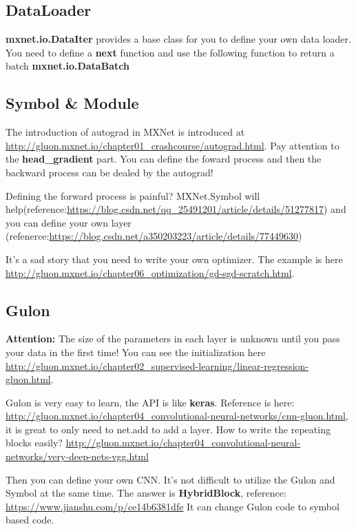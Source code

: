 \documentclass[english]{../TeXTemplate/pkupaper}
\begin{document}
\subsection{DataLoader}

\textbf{mxnet.io.DataIter} provides a base class for you to define your own data loader. You need to define a \textbf{next} function and use the following function to return a batch \textbf{mxnet.io.DataBatch}



\subsection{Symbol \& Module}


The introduction of autograd in MXNet is introduced at \url{http://gluon.mxnet.io/chapter01_crashcourse/autograd.html}. Pay attention to the \textbf{head\_gradient} part. You can define the foward process and then the backward process can be dealed by the autograd!

Defining the forward process is painful? MXNet.Symbol will help(reference:\url{https://blog.csdn.net/qq_25491201/article/details/51277817}) and you can define your own layer (refenerce:\url{https://blog.csdn.net/a350203223/article/details/77449630})

It's a sad story that you need to write your own optimizer. The example is here \url{http://gluon.mxnet.io/chapter06_optimization/gd-sgd-scratch.html}.

\subsection{Gulon}

\textbf{Attention:} The size of the parameters in each layer is unknown until you pass your data in the first time! You can see the initialization here \url{http://gluon.mxnet.io/chapter02_supervised-learning/linear-regression-gluon.html}.



Gulon is very easy to learn, the API is like \textbf{keras}. Reference is here: \url{http://gluon.mxnet.io/chapter04_convolutional-neural-networks/cnn-gluon.html}, it is great to only need to net.add to add a layer. How to write the repeating blocks easily? \url{http://gluon.mxnet.io/chapter04_convolutional-neural-networks/very-deep-nets-vgg.html}

Then you can define your own CNN. It's not difficult to utilize the Gulon and Symbol at the same time. The answer is \textbf{HybridBlock}, reference: \url{https://www.jianshu.com/p/ce14b6381dfe} It can change Gulon code to symbol based code.
\end{document}
